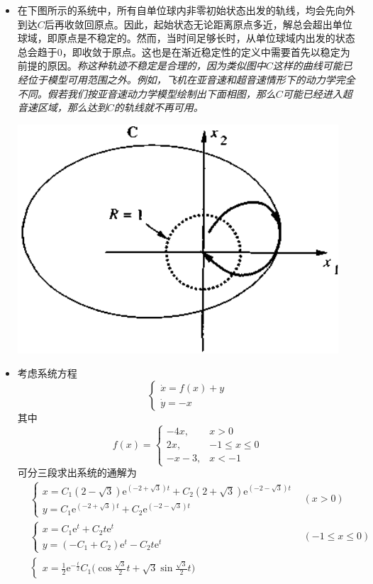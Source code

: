 \begin{example}[稳定与不稳定的图示]
\begin{itemize}[leftmargin=1em]
\begin{center}
    \end{center}
    \item 在下图所示的系统中，所有自单位球内非零初始状态出发的轨线，均会先向外到达$C$后再收敛回原点。因此，起始状态无论距离原点多近，解总会超出单位球域，即原点是不稳定的。然而，当时间足够长时，从单位球域内出发的状态总会趋于$0$，即收敛于原点。这也是在渐近稳定性的定义中需要首先以稳定为前提的原因。{\it 称这种轨迹不稳定是合理的，因为类似图中$C$这样的曲线可能已经位于模型可用范围之外。例如，飞机在亚音速和超音速情形下的动力学完全不同。假若我们按亚音速动力学模型绘制出下面相图，那么$C$可能已经进入超音速区域，那么达到$C$的轨线就不再可用。}
    \begin{center}
      \includegraphics[width=0.35\linewidth]{figure/nonlinear/unstable.png}
    \end{center}
    \item 考虑系统方程\[\begin{cases}
      \dot{x}=f(x)+y\\\dot{y}=-x
    \end{cases}\]
    其中\[
      f(x)=\begin{cases}-4x,&x>0\\2x,&-1\le x\le 0\\-x-3,&x<-1
    \end{cases}\]
    可分三段求出系统的通解为
    \begin{align*}
      &\begin{cases}x=C_{1}(2-\sqrt{3})\mathrm{e}^{(-2+\sqrt{3})t}+C_{2}(2+\sqrt{3})\mathrm{e}^{(-2-\sqrt{3})t}\\
        y=C_{1}\mathrm{e}^{(-2+\sqrt{3})t}+C_{2}\mathrm{e}^{(-2-\sqrt{3})t}\end{cases}&(x>0)\\
      &\begin{cases}x=C_{1}\mathrm{e}^{t}+C_{2}t\mathrm{e}^{t}\\
        y=(-C_{1}+C_2)\mathrm{e}^{t}-C_{2}t\mathrm{e}^{t}\end{cases}&(-1\le x\le 0)\\
      &\begin{cases}x=\frac{1}{2}\mathrm{e}^{-\frac{t}{2}} C_{1}\Big(\cos\frac{\sqrt{3}}{2}t + \sqrt{3} \sin\frac{\sqrt{3}}{2}t\Big)

\end{cases}
\end{align*}
\end{itemize}
\end{example}
